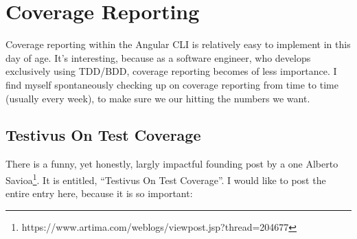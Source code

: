 \maketitle{}
\section{ Coverage Reporting }

Coverage reporting within the Angular CLI is relatively easy to implement in
this day of age. It's interesting, because as a software engineer, who develops
exclusively using TDD/BDD, coverage reporting becomes of less importance. I
find myself spontaneously checking up on coverage reporting from time to time
(usually every week), to make sure we our hitting the numbers we want.

\subsection{Testivus On Test Coverage}
There is a funny, yet honestly, largly impactful founding post by a one
Alberto Savioa\footnote{https://www.artima.com/weblogs/viewpost.jsp?thread=204677}.
It is entitled, ``Testivus On Test Coverage''. I would like to post the entire
entry here, because it is so important:

